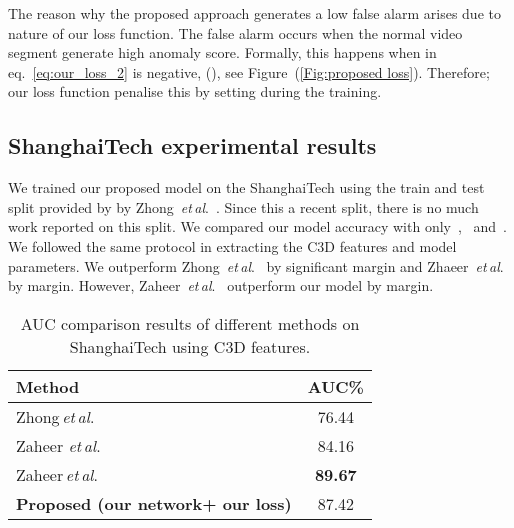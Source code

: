 \documentclass[journal]{IEEEtran}
\newcommand{\authorcite}{{\textit{et}\,\textit{al}.}}
\begin{document}
The reason why the proposed approach generates a low false alarm arises due to nature of our loss function. The false alarm occurs when the normal video segment generate high anomaly score. Formally, this happens when  in eq.~\eqref{eq:our_loss_2} is negative, (), see Figure~(\ref{Fig:proposed loss}). Therefore; our loss function penalise this by setting  during the training.
\subsection{ShanghaiTech experimental results}
We trained our proposed model on the ShanghaiTech using the train and test split provided by by Zhong~\authorcite~\cite{Zhong_2019_CVPR}. Since this a recent split, there is no much work reported on this split. We compared our model accuracy with only~\cite{Zhong_2019_CVPR},~\cite{zaheer2020self} and~\cite{zaheer2020claws}. We followed the same protocol in extracting the C3D features and model parameters. We outperform Zhong~\authorcite~\cite{Zhong_2019_CVPR} by significant  margin and Zhaeer~\authorcite~\cite{zaheer2020self} by  margin. However, Zaheer~\authorcite~\cite{zaheer2020claws} outperform our model by  margin.

\begin{table}[ht]
	\label{tab:ROC_curve_2}
	\centering
	\caption{AUC comparison results of different methods on ShanghaiTech using C3D features.}	
\begin{tabular}[t]{lc}
		\toprule
		Method & AUC\%\\ \midrule
		Zhong\,\authorcite~\cite{Zhong_2019_CVPR}& 76.44\\
		Zaheer \authorcite~\cite{zaheer2020self}&84.16\\
		Zaheer\,\authorcite~\cite{zaheer2020claws} & \textbf{89.67}\\
\midrule
		\textbf{Proposed (our network+ our loss)} & 87.42
		\\
		\bottomrule
	\end{tabular}	
	\label{Tab:AUC_shang}
\end{table}
\end{document}
